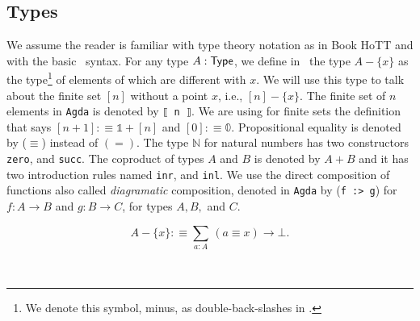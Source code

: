 \documentclass[11pt, a4paper, oneside]{amsart}
\begin{document}
\subsection{Types}

We assume the reader is familiar with type theory notation as in Book HoTT
\cite{hottbook} and with the basic \Agda\, syntax. For any type $A : \mathsf{Type}$,
we define in~ the type $A - \{x\}$ as the type\footnote{We
denote this symbol, minus, as  double-back-slashes in \Agda.} of elements of
which are different with $x$. We will use this type to talk about the finite
set $[n]$ without a point $x$, i.e., $[n] - \{ x\}$. The finite set of $n$
elements in \texttt{Agda} is denoted by \texttt{⟦ n ⟧}. We are using for
finite sets the definition that says $[n + 1] :\equiv 𝟙 + [n]$ and $[0]
:\equiv 𝟘$. Propositional equality is denoted by ($\equiv$) instead of $(=)$.
The type $ℕ$ for natural numbers has two constructors \texttt{zero}, and
\texttt{succ}. The coproduct of types $A$ and $B$ is denoted by $A+B$ and it
has two introduction rules named \texttt{inr}, and \texttt{inl}. We use the
direct composition of functions also called \emph{diagramatic} composition,
denoted in \texttt{Agda} by (\texttt{f :> g}) for $f : A \to B$ and $g : B \to
C$, for types $A,B,$ and $C$.

\begin{equation}\label{eq:minus}
A - \{x\} :\equiv \sum_{a : A} \, (a ≡ x) → \bot.
\end{equation}

\begin{code}[hide]%
%
\>[2]%
\>[7]\AgdaSymbol{:}\AgdaSpace{}%
\AgdaSpace{}%
\AgdaSymbol{\{}\AgdaSpace{}%
\AgdaSymbol{:}\AgdaSpace{}%
\AgdaSymbol{\}}\AgdaSpace{}%
\AgdaSpace{}%
\AgdaSymbol{(}\AgdaSpace{}%
\AgdaSymbol{:}\AgdaSpace{}%
\AgdaSpace{}%
\AgdaSymbol{)}\AgdaSpace{}%
\AgdaSymbol{(}\AgdaSpace{}%
\AgdaSymbol{:}\AgdaSpace{}%
\AgdaSymbol{)}\AgdaSpace{}%
\AgdaSpace{}%
\AgdaSpace{}%
\<%
\\
%
\>[2]%
\>[7]\AgdaSymbol{\{}\AgdaSymbol{\}}\AgdaSpace{}%
\AgdaSpace{}%
%
\>[16]\AgdaSymbol{=}\AgdaSpace{}%
\AgdaSpace{}%
\AgdaSpace{}%
\AgdaSpace{}%
\AgdaSpace{}%
\AgdaSpace{}%
\AgdaSymbol{((}\AgdaSpace{}%
\AgdaSpace{}%
\AgdaSymbol{)}\AgdaSpace{}%
\AgdaSpace{}%
\AgdaSpace{}%
\AgdaSymbol{))}\<%
\end{code}
\end{document}
